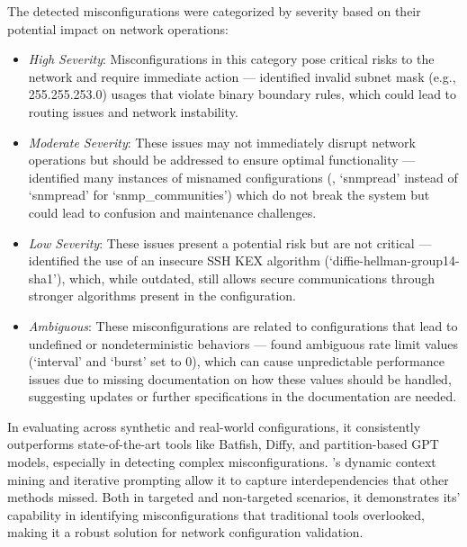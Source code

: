 The detected misconfigurations were categorized by severity based on their potential impact on network operations:
\begin{itemize}
    \item \textit{High Severity}: Misconfigurations in this category pose critical risks to the network and require immediate action --- \sysname{} identified invalid subnet mask (e.g., 255.255.253.0) usages that violate binary boundary rules, which could lead to routing issues and network instability.
    \item \textit{Moderate Severity}: These issues may not immediately disrupt network operations but should be addressed to ensure optimal functionality ---
    \sysname{} identified many instances of misnamed configurations (\eg, `snmpread' instead of `snmpread' for `snmp\_communities') which do not break the system but could lead to confusion and maintenance challenges.
    \item \textit{Low Severity}: These issues present a potential risk but are not critical ---  \sysname{} identified the use of an insecure SSH KEX algorithm (`diffie-hellman-group14-sha1'), which, while outdated, still allows secure communications through stronger algorithms present in the configuration.
    \item \textit{Ambiguous}: These misconfigurations are related to configurations that lead to undefined or nondeterministic behaviors --- \sysname{} found ambiguous rate limit values (`interval' and `burst' set to 0), which can cause unpredictable performance issues due to missing documentation on how these values should be handled, suggesting updates or further specifications in the documentation are needed.
\end{itemize}


In evaluating \sysname{} across synthetic and real-world configurations, it consistently outperforms state-of-the-art tools like Batfish, Diffy, and partition-based GPT models, especially in detecting complex misconfigurations. \sysname{}'s dynamic context mining and iterative prompting allow it to capture interdependencies that other methods missed. Both in targeted and non-targeted scenarios, it demonstrates its' capability in identifying misconfigurations that traditional tools overlooked, making it a robust solution for network configuration validation.